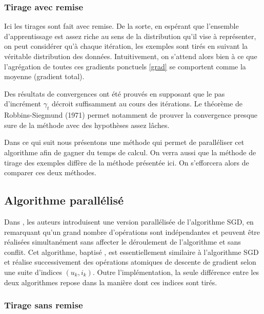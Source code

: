 \documentclass[10pt,a4paper]{article}
\begin{document}
\subsubsection*{Tirage avec remise}

Ici les tirages sont fait avec remise. De la sorte, en espérant que l'ensemble d'apprentissage est assez riche au sens de la distribution qu'il vise à représenter, on peut considérer qu'à chaque itération, les exemples sont tirés en suivant la véritable distribution des données. Intuitivement, on s'attend alors bien à ce que l'agrégation de toutes ces gradients ponctuels \eqref{grad} se comportent comme la moyenne (gradient total).

Des résultats de convergences ont été prouvés en supposant que le pas d'incrément $\gamma_t$ décroit suffisamment au cours des itérations. Le théorème de Robbins-Siegmund (1971) permet notamment de prouver la convergence presque sure de la méthode avec des hypothèses assez lâches.

Dans ce qui suit nous présentons une méthode qui permet de paralléliser cet algorithme afin de gagner du temps de calcul. On verra aussi que la méthode de tirage des exemples diffère de la méthode présentée ici. On s'efforcera alors de comparer ces deux méthodes.

\subsection{Algorithme parallélisé \jel }

Dans \cite{jelly}, les auteurs introduisent une version parallélisée de l'algorithme SGD, en remarquant qu'un grand nombre d'opérations sont indépendantes et peuvent être réalisées simultanément sans affecter le déroulement de l'algorithme et sans conflit. Cet algorithme, baptisé \jel, est essentiellement similaire à l'algorithme SGD et réalise successivement des opérations atomiques de descente de gradient selon une suite d'indices $(u_k,i_k)$. Outre l'implémentation, la seule différence entre les deux algorithmes repose dans la manière dont ces indices sont tirés.

\subsubsection*{Tirage sans remise}
\end{document}
